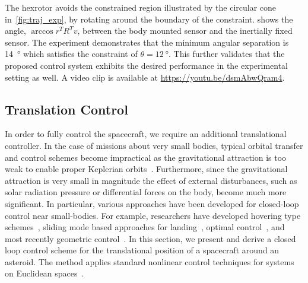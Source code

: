 The hexrotor avoids the constrained region illustrated by the circular cone in~\cref{fig:traj_exp}, by rotating around the boundary of the constraint. 
 shows the angle, \( \arccos r^T R^T v \), between the body mounted sensor and the inertially fixed sensor.
The experiment demonstrates that the minimum angular separation is \SI{14}{\degree} which satisfies the constraint of \( \theta = \SI{12}{\degree} \).
This further validates that the proposed control system exhibits the desired performance in the experimental setting as well. 
A video clip is available at \url{https://youtu.be/dsmAbwQram4}.

\subsection{Translation Control}
In order to fully control the spacecraft, we require an additional translational controller.
In the case of missions about very small bodies, typical orbital transfer and control schemes become impractical as the gravitational attraction is too weak to enable proper Keplerian orbits~\cite{broschart2005}.
Furthermore, since the gravitational attraction is very small in magnitude the effect of external disturbances, such as solar radiation pressure or differential forces on the body, become much more significant.
In particular, various approaches have been developed for closed-loop control near small-bodies.
For example, researchers have developed hovering type schemes~\cite{broschart2005,sawai2002}, sliding mode based approaches for landing~\cite{furfaro2013,liaw2000,zexu2012}, optimal control~\cite{guelman1994,guo2011,lantoine2006,miso1999}, and most recently geometric control~\cite{kulumani2017b,misra2015a}.
In this section, we present and derive a closed loop control scheme for the translational position of a spacecraft around an asteroid.
The method applies standard nonlinear control techniques for systems on Euclidean spaces~\cite{khalil1996}.

